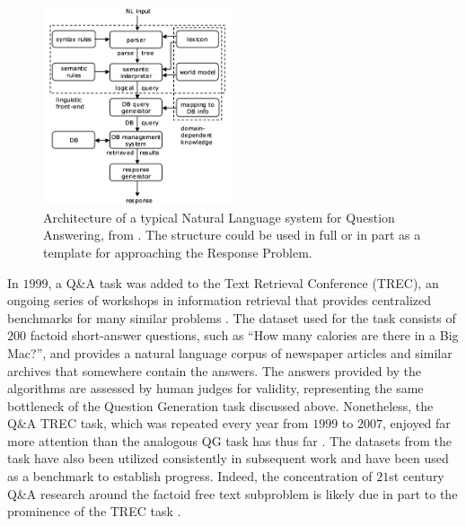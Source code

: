 \begin{figure}[h]
\centerline{%
\includegraphics[width=0.5\textwidth]{figures/NLPQA.png}}%
\caption{Architecture of a typical Natural Language system for Question Answering, from  \citep{androutsopoulos1995natural}. The structure could be used in full or in part as a template for approaching the Response Problem.}
\label{fig:NLPQA}
\end{figure}

In $1999$, a Q\&A task was added to the Text Retrieval Conference (TREC), an ongoing series of workshops in information retrieval that provides centralized benchmarks for many similar problems  \citep{voorhees1999trec}. The dataset used for the task consists of $200$ factoid short-answer questions, such as ``How many calories are there in a Big Mac?'', and provides a natural language corpus of newspaper articles and similar archives that somewhere contain the answers. The answers provided by the algorithms are assessed by human judges for validity, representing the same bottleneck of the Question Generation task discussed above. Nonetheless, the Q\&A TREC task, which was repeated every year from $1999$ to $2007$, enjoyed far more attention than the analogous QG task has thus far \citep{dang2007overview}. The datasets from the task have also been utilized consistently in subsequent work and have been used as a benchmark to establish progress. Indeed, the concentration of $21$st century Q\&A research around the factoid free text subproblem is likely due in part to the prominence of the TREC task  \citep{hirschman2001natural}.


